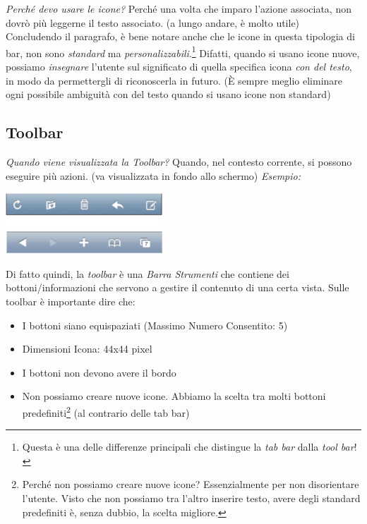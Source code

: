 \documentclass[oneside]{book}
\begin{document}
			\emph{Perché devo usare le icone?} Perché una volta che imparo l'azione associata, non dovrò più leggerne il testo associato. (a lungo andare, è molto utile)\\

			Concludendo il paragrafo, è bene notare anche che le icone in questa tipologia di bar, non sono \emph{standard} ma \emph{personalizzabili}.\footnote{Questa è una delle differenze principali che distingue la \emph{tab bar} dalla \emph{tool bar}!} Difatti, quando si usano icone nuove, possiamo \emph{insegnare} l'utente sul significato di quella specifica icona \emph{con del testo}, in modo da permettergli di riconoscerla in futuro. (È sempre meglio eliminare ogni possibile ambiguità con del testo quando si usano icone non standard) 

		\subsection{Toolbar} \label{sez:toolbar}
			\emph{Quando viene visualizzata la Toolbar?} Quando, nel contesto corrente, si possono eseguire più azioni. (va visualizzata in fondo allo schermo) \emph{Esempio:}
			\begin{center}
			\includegraphics[height = 23mm]{images/toolbar.png}
			\end{center}

			Di fatto quindi, la \emph{toolbar} è una \emph{Barra Strumenti} che contiene dei bottoni/informazioni che servono a gestire il contenuto di una certa vista. Sulle toolbar è importante dire che:
			\begin{itemize}
			\item I bottoni siano equispaziati (Massimo Numero Consentito: 5)
			\item Dimensioni Icona: 44x44 pixel
			\item I bottoni non devono avere il bordo
			\item Non possiamo creare nuove icone. Abbiamo la scelta tra molti bottoni predefiniti\footnote{Perché non possiamo creare nuove icone? Essenzialmente per non disorientare l'utente. Visto che non possiamo tra l'altro inserire testo, avere degli standard predefiniti è, senza dubbio, la scelta migliore.} (al contrario delle tab bar)
			\end{itemize}
\end{document}
